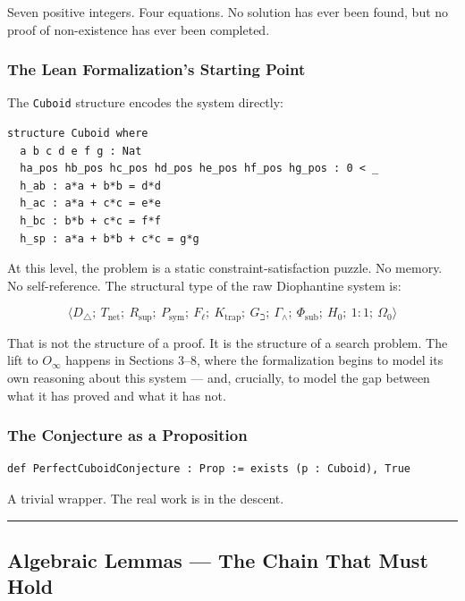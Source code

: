 \documentclass[12pt,a4paper]{article}
\begin{document}
Seven positive integers. Four equations. No solution has ever been found, but no proof of non-existence has ever been completed.

\subsubsection{The Lean Formalization's Starting Point}

The \texttt{Cuboid} structure encodes the system directly:

\begin{lstlisting}[language=lean]
structure Cuboid where
  a b c d e f g : Nat
  ha_pos hb_pos hc_pos hd_pos he_pos hf_pos hg_pos : 0 < _
  h_ab : a*a + b*b = d*d
  h_ac : a*a + c*c = e*e
  h_bc : b*b + c*c = f*f
  h_sp : a*a + b*b + c*c = g*g
\end{lstlisting}

At this level, the problem is a static constraint-satisfaction puzzle. No memory. No self-reference. The structural type of the raw Diophantine system is:

\[\langle D_{\triangle};\ T_\text{net};\ R_\text{sup};\ P_\text{sym};\ F_{\ell};\ K_\text{trap};\ G_{\beth};\ \Gamma_{\wedge};\ \Phi_\text{sub};\ H_0;\ 1{:}1;\ \Omega_0 \rangle\]

That is not the structure of a proof. It is the structure of a search problem. The lift to $O_{\infty}$ happens in Sections 3--8, where the formalization begins to model its own reasoning about this system --- and, crucially, to model the gap between what it has proved and what it has not.

\subsubsection{The Conjecture as a Proposition}

\begin{lstlisting}[language=lean]
def PerfectCuboidConjecture : Prop := exists (p : Cuboid), True
\end{lstlisting}

A trivial wrapper. The real work is in the descent.

\begin{center}
\rule{0.5\textwidth}{0.4pt}
\end{center}

\subsection{Algebraic Lemmas --- The Chain That Must Hold}
\end{document}
